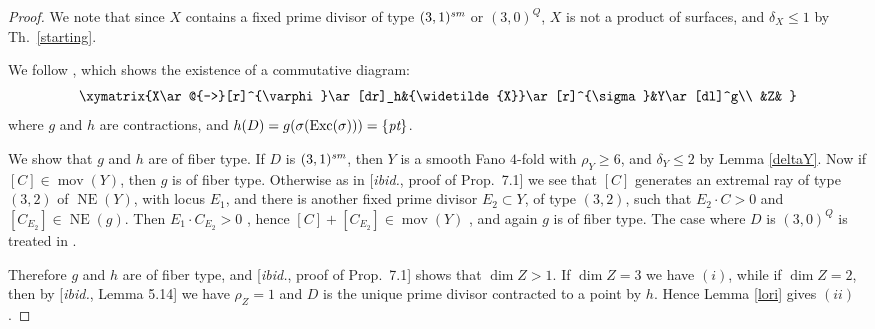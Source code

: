 \documentclass[a4paper,12pt]{amsart}
\theoremstyle{definition}
\numberwithin{figure}{section}
\numberwithin{table}{section}
\newcommand{\ph}{\varphi}
\newcommand{\w}{\widetilde}
\newcommand{\NE}{\operatorname{NE}}
\newcommand{\Exc}{\operatorname{Exc}}
\newcommand{\mov}{\operatorname{mov}}
\newcommand{\sm}{\text{\it sm}}
\newcommand{\pt}{\text{\it pt}}
\begin{document}
  \begin{proof}
    We note that since $X$ contains a fixed prime divisor of type $(3,1)^{\sm}$ or $(3,0)^Q$, $X$ is not a product of surfaces, and $\delta_X\leq 1$ by Th.~\ref{starting}.
    
    We follow \cite[proof of Prop.~7.1]{small}, which shows the existence of a commutative diagram:
    $$\xymatrix{X\ar@{-->}[r]^{\ph}\ar[dr]_h&{\w{X}}\ar[r]^{\sigma}&Y\ar[dl]^g\\
      &Z&
      }$$
where $g$ and $h$ are contractions, and $h(D)=g(\sigma(\Exc(\sigma)))=\{\pt\}$.

    We show that $g$ and $h$ are of fiber type.
    If $D$ is $(3,1)^{\sm}$, then $Y$ is a smooth Fano $4$-fold with $\rho_Y\geq 6$, and $\delta_Y\leq 2$ by Lemma \ref{deltaY}. Now if $[C]\in\mov(Y)$, then $g$ is of fiber type. Otherwise as in [\emph{ibid.}, proof of Prop.~7.1] we see that $[C]$ generates an extremal ray of type $(3,2)$ of $\NE(Y)$, with locus $E_1$, and there is another
 fixed prime divisor $E_2\subset Y$, of type $(3,2)$, such that $E_2\cdot C>0$ and  $[C_{E_2}]\in\NE(g)$. Then $E_1\cdot C_{E_2}>0$ \cite[Lemma 2.2(b)]{cdue}, hence $[C]+[C_{E_2}]\in\mov(Y)$ \cite[Lemma 4.6 and its proof]{fibrations}, and again $g$    
 is of fiber type.
The case where 
$D$ is $(3,0)^Q$ is treated in \cite[proof of Prop.~7.1]{small}.

Therefore $g$ and $h$ are of fiber type, and
 [\emph{ibid.}, proof of Prop.~7.1] shows that $\dim Z>1$.
If $\dim Z=3$ we have $(i)$, while 
if $\dim Z=2$, then by [\emph{ibid.}, Lemma 5.14] we have
$\rho_Z=1$ and $D$ is the unique prime divisor contracted to a point by $h$. Hence Lemma \ref{lori}  gives $(ii)$.
   \end{proof} 
\end{document}
